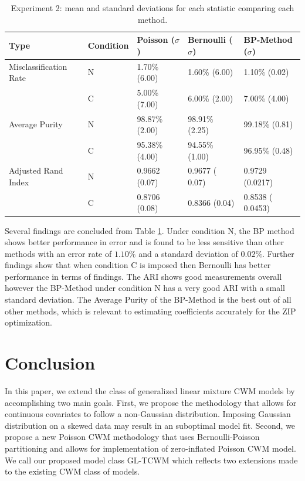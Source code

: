 \documentclass[11pt,letterpaper]{article}
\numberwithin{equation}{section}
\numberwithin{equation}{section}
\numberwithin{equation}{section}
\begin{document}
\begin{table}[!htb]
\begin{center}
\caption{Experiment 2: mean and standard deviations for each statistic comparing each method.}
\label{table:exper2}
\begin{tabular}{lllll}
\hline\hline
Type   & Condition & Poisson  ($\sigma $) & Bernoulli  ($ \sigma $) & BP-Method ($ \sigma $) \\
\hline
Misclassification Rate& N         & 1.70\%  (6.00)       & 1.60\% (6.00)         & 1.10\% (0.02)         \\
       & C         & 5.00\%  (7.00)       & 6.00\% (2.00)         & 7.00\% (4.00)         \\
Average Purity & N         & 98.87\% (2.00)    & 98.91\% (2.25)      & 99.18\% (0.81)     \\
       & C         & 95.38\% (4.00)    & 94.55\% (1.00)      & 96.95\% (0.48)      \\
Adjusted Rand Index  & N         & 0.9662 (0.07)    & 0.9677  ( 0.07)     & 0.9729 (0.0217)      \\
       & C         & 0.8706 (0.08)    & 0.8366 (0.04)      & 0.8538 ( 0.0453) \\
       \hline\hline
\end{tabular}
\end{center}
\end{table}
Several findings are concluded from Table \ref{table:exper2}. Under condition N, the BP method shows better performance in error and is found to be less sensitive than other methods with an error rate of $ 1.10 \% $ and a standard deviation of $ 0.02 \% $.  Further findings show that when condition C is imposed then Bernoulli has better performance in terms of findings. The ARI shows good measurements overall however the BP-Method under condition N has a very good ARI with a small standard deviation. The Average Purity of the BP-Method is the best out of all other methods, which is relevant to estimating coefficients accurately for the ZIP optimization.

\section{Conclusion}

In this paper, we extend the class of generalized linear mixture CWM models by accomplishing two main goals. First, we propose the methodology that allows for continuous covariates to follow a non-Gaussian distribution. Imposing Gaussian distribution on a skewed data may result in an suboptimal model fit. Second, we propose a new Poisson CWM methodology that uses Bernoulli-Poisson partitioning and allows for implementation of zero-inflated Poisson CWM model. We call our proposed model class GL-TCWM which reflects two extensions made to the existing CWM class of models.
\end{document}
